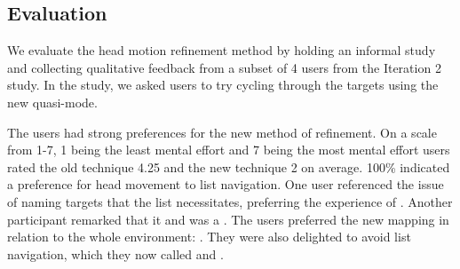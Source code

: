 \subsection{Evaluation}
We evaluate the head motion refinement method by holding an informal study and
collecting qualitative feedback from a subset of 4 users from the Iteration 2
study. In the study, we asked users to try cycling through the targets using
the new quasi-mode.

The users had strong preferences for the new method of refinement.
 On a scale from 1-7, 1 being the least mental effort and
7 being the most mental effort users rated the old technique 4.25 and
the new technique 2 on average. 100\% indicated a preference for head
movement to list navigation. One user referenced the issue of naming
targets that the list necessitates, preferring the experience of
.  Another
participant remarked that it  and was
a . The
users preferred the new mapping in relation to the whole environment:
. They were also delighted to avoid list navigation,
which they now called  and .
